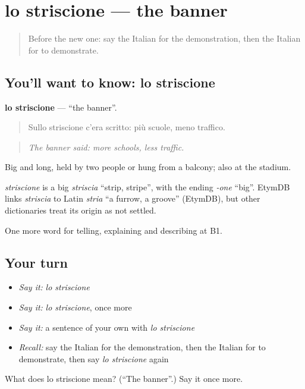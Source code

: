 \section[lo striscione]{lo striscione — the banner}

\label{lesson:IT-C364-striscione}



\begin{quote}
Before the new one: say the Italian for the demonstration, then the Italian for to demonstrate.
\end{quote}

\subsection*{You'll want to know: lo striscione}
\textbf{lo striscione} — \textquotedblleft{}the banner\textquotedblright{}.

\begin{quote}
Sullo striscione c'era scritto: più scuole, meno traffico.
\end{quote}

\begin{quote}
\emph{The banner said: more schools, less traffic.}
\end{quote}

Big and long, held by two people or hung from a balcony; also at the stadium.

\begin{cousinweb}
\emph{striscione} is a big \emph{striscia} \textquotedblleft{}strip, stripe\textquotedblright{}, with the ending \emph{-one} \textquotedblleft{}big\textquotedblright{}. EtymDB links \emph{striscia} to Latin \emph{stria} \textquotedblleft{}a furrow, a groove\textquotedblright{} (EtymDB), but other dictionaries treat its origin as not settled.
\end{cousinweb}

\begin{grammarlens}[title={What you've built}]
One more word for telling, explaining and describing at B1.
\end{grammarlens}

\subsection*{Your turn}
\begin{itemize}
\raggedright
  \item \emph{Say it:} \emph{lo striscione}
  \item \emph{Say it:} \emph{lo striscione}, once more
  \item \emph{Say it:} a sentence of your own with \emph{lo striscione}
  \item \emph{Recall:} say the Italian for the demonstration, then the Italian for to demonstrate, then say \emph{lo striscione} again
\end{itemize}

\begin{tcolorbox}[breakable,colback=teal!4,colframe=teal!35!black,title={Before you move on}]
What does lo striscione mean? (\textquotedblleft{}The banner\textquotedblright{}.) Say it once more.
\end{tcolorbox}
